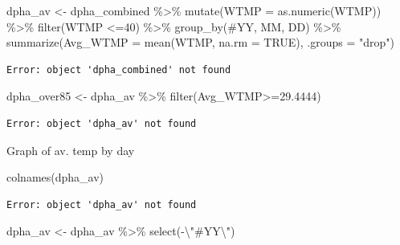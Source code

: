 \documentclass[
  letterpaper,
  DIV=11,
  numbers=noendperiod]{scrreprt}
\newenvironment{Shaded}{\begin{snugshade}}{\end{snugshade}}
\newcommand{\AttributeTok}[1]{\textcolor[rgb]{0.40,0.45,0.13}{#1}}
\newcommand{\ConstantTok}[1]{\textcolor[rgb]{0.56,0.35,0.01}{#1}}
\newcommand{\DecValTok}[1]{\textcolor[rgb]{0.68,0.00,0.00}{#1}}
\newcommand{\FloatTok}[1]{\textcolor[rgb]{0.68,0.00,0.00}{#1}}
\newcommand{\FunctionTok}[1]{\textcolor[rgb]{0.28,0.35,0.67}{#1}}
\newcommand{\NormalTok}[1]{\textcolor[rgb]{0.00,0.23,0.31}{#1}}
\newcommand{\OtherTok}[1]{\textcolor[rgb]{0.00,0.23,0.31}{#1}}
\newcommand{\SpecialCharTok}[1]{\textcolor[rgb]{0.37,0.37,0.37}{#1}}
\newcommand{\StringTok}[1]{\textcolor[rgb]{0.13,0.47,0.30}{#1}}
\begin{document}
\begin{Shaded}
\begin{Highlighting}[]
\NormalTok{dpha\_av }\OtherTok{\textless{}{-}}\NormalTok{ dpha\_combined }\SpecialCharTok{\%\textgreater{}\%}
  \FunctionTok{mutate}\NormalTok{(}\AttributeTok{WTMP =} \FunctionTok{as.numeric}\NormalTok{(WTMP)) }\SpecialCharTok{\%\textgreater{}\%}
  \FunctionTok{filter}\NormalTok{(WTMP }\SpecialCharTok{\textless{}=}\DecValTok{40}\NormalTok{) }\SpecialCharTok{\%\textgreater{}\%}
  \FunctionTok{group\_by}\NormalTok{(}\StringTok{\textquotesingle{}\#YY\textquotesingle{}}\NormalTok{, MM, DD) }\SpecialCharTok{\%\textgreater{}\%}
  \FunctionTok{summarize}\NormalTok{(}\AttributeTok{Avg\_WTMP =} \FunctionTok{mean}\NormalTok{(WTMP, }\AttributeTok{na.rm =} \ConstantTok{TRUE}\NormalTok{), }\AttributeTok{.groups =} \StringTok{"drop"}\NormalTok{)}
\end{Highlighting}
\end{Shaded}

\begin{verbatim}
Error: object 'dpha_combined' not found
\end{verbatim}

\begin{Shaded}
\begin{Highlighting}[]
\NormalTok{dpha\_over85 }\OtherTok{\textless{}{-}}\NormalTok{ dpha\_av }\SpecialCharTok{\%\textgreater{}\%}
  \FunctionTok{filter}\NormalTok{(Avg\_WTMP}\SpecialCharTok{\textgreater{}=}\FloatTok{29.4444}\NormalTok{)}
\end{Highlighting}
\end{Shaded}

\begin{verbatim}
Error: object 'dpha_av' not found
\end{verbatim}

Graph of av. temp by day

\begin{Shaded}
\begin{Highlighting}[]
\FunctionTok{colnames}\NormalTok{(dpha\_av)}
\end{Highlighting}
\end{Shaded}

\begin{verbatim}
Error: object 'dpha_av' not found
\end{verbatim}

\begin{Shaded}
\begin{Highlighting}[]
\NormalTok{dpha\_av }\OtherTok{\textless{}{-}}\NormalTok{ dpha\_av }\SpecialCharTok{\%\textgreater{}\%}
  \FunctionTok{select}\NormalTok{(}\SpecialCharTok{{-}}\StringTok{\textasciigrave{}}\SpecialCharTok{\textbackslash{}"}\AttributeTok{\#YY}\SpecialCharTok{\textbackslash{}"}\StringTok{\textasciigrave{}}\NormalTok{)}
\end{Highlighting}
\end{Shaded}
\end{document}
